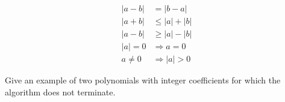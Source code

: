 \begin{lemma}
	\begin{align*}
		|a - b| &= |b - a|\\
		|a + b| &\leq |a| + |b|\\
		|a - b| &\geq |a| - |b|\\
		|a| = 0 &\Rightarrow a = 0\\
		a \neq 0 &\Rightarrow |a| > 0
	\end{align*}
\end{lemma}

\begin{exercise}
	Give an example of two polynomials with integer coefficients for which
	the algorithm does not terminate.
\end{exercise}

